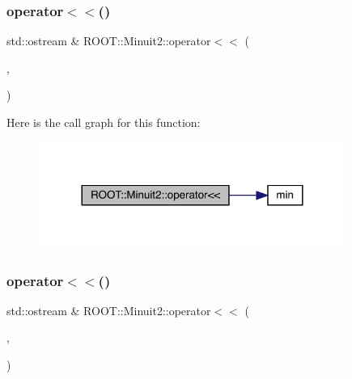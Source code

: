 \mbox{\label{namespaceROOT_1_1Minuit2_a38083dea2c583232d8c33ed056b555ef}} 
\subsubsection{\texorpdfstring{operator$<$$<$()}{operator<<()}\hspace{0.1cm}{\footnotesize\ttfamily [1/11]}}
{\footnotesize\ttfamily std\+::ostream \& R\+O\+O\+T\+::\+Minuit2\+::operator$<$$<$ (\begin{DoxyParamCaption}\item[{std\+::ostream \&}]{,  }\item[{const \mbox{\hyperlink{classROOT_1_1Minuit2_1_1FunctionMinimum}{Function\+Minimum}} \&}]{ }\end{DoxyParamCaption})}

Here is the call graph for this function\+:\nopagebreak
\begin{figure}[H]
\begin{center}
\leavevmode
\includegraphics[width=284pt]{d6/d3a/namespaceROOT_1_1Minuit2_a38083dea2c583232d8c33ed056b555ef_cgraph}
\end{center}
\end{figure}
\mbox{\label{namespaceROOT_1_1Minuit2_a172c627b1d5fd6191ca54f94090cd304}} 
\subsubsection{\texorpdfstring{operator$<$$<$()}{operator<<()}\hspace{0.1cm}{\footnotesize\ttfamily [2/11]}}
{\footnotesize\ttfamily std\+::ostream \& R\+O\+O\+T\+::\+Minuit2\+::operator$<$$<$ (\begin{DoxyParamCaption}\item[{std\+::ostream \&}]{,  }\item[{const \mbox{\hyperlink{classROOT_1_1Minuit2_1_1MinimumState}{Minimum\+State}} \&}]{ }\end{DoxyParamCaption})}

